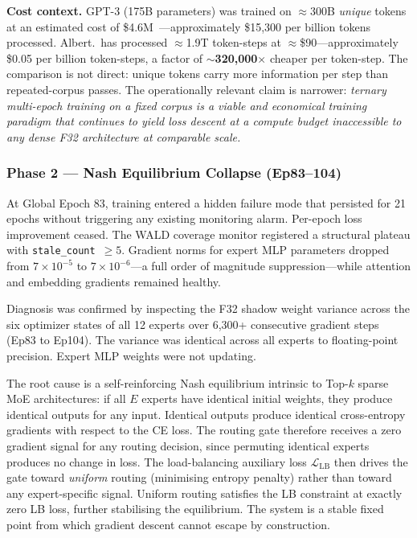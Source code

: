 \documentclass[11pt,a4paper]{article}
\begin{document}
\textbf{Cost context.}
GPT-3 (175B parameters) was trained on $\approx$300B \emph{unique} tokens at
an estimated cost of \$4.6M~\cite{patterson2021carbon}---approximately
\$15,300 per billion tokens processed.
Albert.\ has processed $\approx$1.9T token-steps at $\approx$\$90---approximately \$0.05 per
billion token-steps, a factor of \textbf{$\sim$320,000$\times$} cheaper per
token-step.
The comparison is not direct: unique tokens carry more information per step
than repeated-corpus passes. The operationally relevant claim is narrower:
\emph{ternary multi-epoch training on a fixed corpus is a viable and economical
training paradigm that continues to yield loss descent at a compute budget
inaccessible to any dense F32 architecture at comparable scale.}

\subsubsection{Phase 2 --- Nash Equilibrium Collapse (Ep83--104)}

At Global Epoch 83, training entered a hidden failure mode that persisted for
21 epochs without triggering any existing monitoring alarm. Per-epoch loss
improvement ceased. The WALD coverage monitor registered a structural plateau
with \texttt{stale\_count}~$\geq 5$. Gradient norms for expert MLP parameters
dropped from $7\!\times\!10^{-5}$ to $7\!\times\!10^{-6}$---a full order of
magnitude suppression---while attention and embedding gradients remained healthy.

Diagnosis was confirmed by inspecting the F32 shadow weight variance across the
six optimizer states of all 12 experts over 6,300+ consecutive gradient steps
(Ep83 to Ep104). The variance was identical across all experts to floating-point
precision. Expert MLP weights were not updating.

The root cause is a self-reinforcing Nash equilibrium intrinsic to Top-$k$ sparse
MoE architectures: if all $E$ experts have identical initial weights, they produce
identical outputs for any input. Identical outputs produce identical cross-entropy
gradients with respect to the CE loss. The routing gate therefore receives a zero
gradient signal for any routing decision, since permuting identical experts produces
no change in loss. The load-balancing auxiliary loss $\mathcal{L}_\text{LB}$ then
drives the gate toward \emph{uniform} routing (minimising entropy penalty) rather
than toward any expert-specific signal. Uniform routing satisfies the LB constraint
at exactly zero LB loss, further stabilising the equilibrium. The system is a
stable fixed point from which gradient descent cannot escape by construction.
\end{document}

